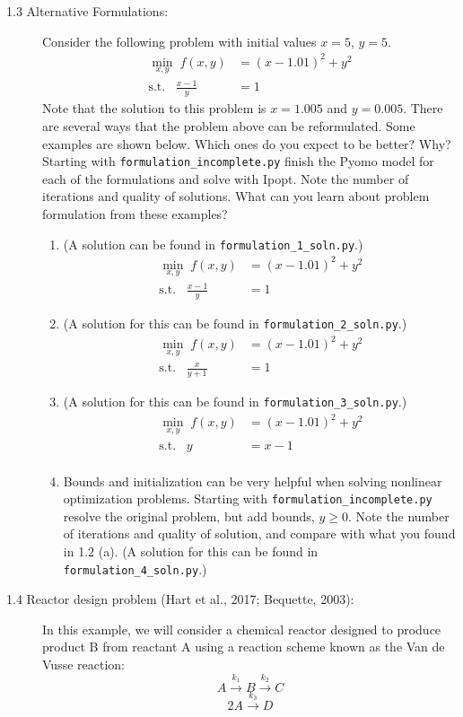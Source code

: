 \documentclass[12pt]{article}
\begin{document}
\begin{description}
\newpage
\item[1.3 Alternative Formulations:] Consider the following problem with initial values $x{=}5$, $y{=}5$.
\begin{align*}
  \min_{x,y} \; f(x,y)&=(x-1.01)^2 + y^2 \\
  \mbox{s.t.} \;\;\; \frac{x-1}{y} &= 1
\end{align*}
Note that the solution to this problem is $x{=}1.005$ and $y{=}0.005$.
There are several ways that the problem above can be reformulated. Some examples are shown below.
Which ones do you expect to be better? Why? Starting with {\tt formulation\_incomplete.py} finish the Pyomo model for each of the
formulations and solve with {\sc Ipopt}. Note the number of iterations and quality of solutions. What can you learn about problem formulation from these examples?

\begin{enumerate}[label=(\alph*)]
\item (A solution can be found in {\tt formulation\_1\_soln.py}.)
  \begin{align*}
    \min_{x,y} \; f(x,y)&=(x-1.01)^2 + y^2 \\
    \mbox{s.t.} \;\;\; \frac{x-1}{y} &= 1
  \end{align*}
\item (A solution for this can be found in {\tt formulation\_2\_soln.py}.)
  \begin{align*}
  \min_{x,y} \; f(x,y)&=(x-1.01)^2 + y^2 \\
  \mbox{s.t.} \;\;\; \frac{x}{y+1} &= 1
  \end{align*}
\item (A solution for this can be found in {\tt formulation\_3\_soln.py}.)
  \begin{align*}
  \min_{x,y} \; f(x,y)&=(x-1.01)^2 + y^2 \\
  \mbox{s.t.} \;\;\; y &= x-1 \\
  \end{align*}
\item Bounds and initialization can be very helpful when solving nonlinear optimization problems. Starting with {\tt formulation\_incomplete.py} resolve the original problem, but add bounds, $y \ge 0$. Note the number of iterations and quality of solution, and compare with what you found in 1.2 (a). (A solution for this can be found in {\tt formulation\_4\_soln.py}.)
\end{enumerate}


\newpage
\item[1.4 Reactor design problem (Hart et al., 2017; Bequette, 2003):]
  In this example, we will consider a chemical reactor designed to produce product B from reactant A using a reaction scheme known as the Van de Vusse reaction:
\[
A \stackrel{k_1}{\rightarrow} B \stackrel{k_2}{\rightarrow} C
\]
\[
2 A \stackrel{k_3}{\rightarrow} D 
\]


\end{description}
\end{document}
